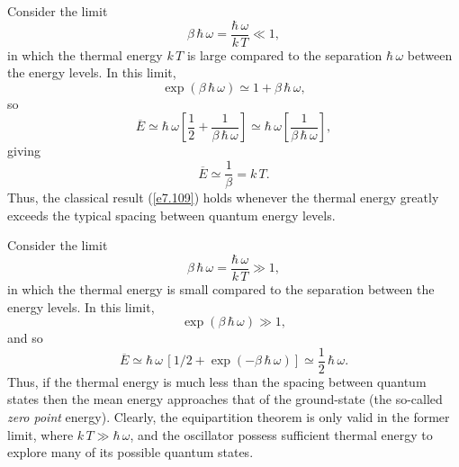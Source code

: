 Consider the limit 
\begin{equation}
\beta\,\hbar\,\omega = \frac{\hbar\, \omega}{k\,T} \ll 1,
\end{equation}
in which the thermal energy $k\,T$ is large compared to the separation $\hbar \,\omega$ between the
energy levels. In this limit,
\begin{equation}
\exp(\beta\,\hbar\,\omega) \simeq 1 + \beta \,\hbar\, \omega,
\end{equation}
so
\begin{equation}
\overline{E} \simeq  \hbar\,\omega\left[\frac{1}{2} + \frac{1}{\beta\,\hbar\,\omega}\right]
\simeq \hbar\,\omega\left[ \frac{1}{\beta\,\hbar\,\omega}\right],
\end{equation}
giving
\begin{equation}
\overline{E} \simeq \frac{1}{\beta} = k\,T.
\end{equation}
Thus, the classical result (\ref{e7.109}) holds whenever the thermal energy greatly exceeds the typical
spacing between quantum energy levels. 


Consider the limit 
\begin{equation}
\beta\,\hbar\,\omega = \frac{\hbar \,\omega}{k\,T} \gg 1,
\end{equation}
in which the thermal energy  is small compared to the separation between
the energy levels. In this limit,
\begin{equation}
\exp(\beta\,\hbar\,\omega) \gg 1,
\end{equation}
and so
\begin{equation}
\overline{E} \simeq \hbar\,\omega \,[ 1/2 + \exp(-\beta\,\hbar\,\omega)] \simeq
\frac{1}{2} \,\hbar \,\omega.
\end{equation}
Thus, if the thermal energy is much less than the spacing between quantum states then
the mean energy approaches that of the ground-state (the so-called {\em zero point}
 energy).
Clearly, the equipartition theorem is only valid in the former limit, where
$k\,T \gg \hbar\, \omega$, and the oscillator possess sufficient thermal energy to explore many
of its possible quantum states. 

